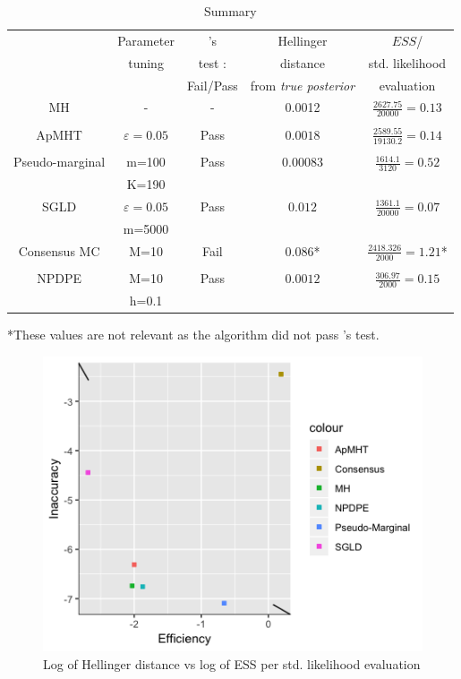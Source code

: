 \documentclass[11pt,a4paper]{report}\usepackage[]{graphicx}\usepackage[]{color}
\begin{document}
\begin{table}[H]
    \centering
    \caption{Summary}
    \label{tab1}
    \begin{tabular}{ccccc}
\hline
&Parameter &\cite{geweke2004getting}'s & Hellinger & $ESS$/\\
&tuning&test :&distance&std. likelihood\\
&&  Fail/Pass &  from \textit{true posterior} &    evaluation\\

\hline
MH &-& - & 0.0012 & $\frac{2627.75}{20000}=0.13$ \\
&&&&\\
\hline
ApMHT &$\varepsilon=0.05$& Pass & $0.0018$ & $\frac{2589.55}{19130.2}=0.14$ \\
&&&&\\
\hline
Pseudo-marginal &m=100& Pass & $0.00083$ &$\frac{1614.1}{3120}=0.52$\\
&K=190&&&\\
\hline
SGLD &$\varepsilon=0.05$& Pass & $0.012$ & $\frac{1361.1}{20000}=0.07$\\
&m=5000&&&\\
\hline
Consensus MC &M=10& Fail & $0.086$* & $\frac{2418.326}{2000}=1.21$*\\
&&&&\\
\hline
NPDPE &M=10& Pass & $0.0012$&$\frac{306.97}{2000}=0.15$\\
&h=0.1&&&\\
\hline
\end{tabular}
\small{*These values are not relevant as the algorithm did not pass \cite{geweke2004getting}'s test.}
\end{table}

\begin{figure}[H]
\caption{Log of Hellinger distance vs log of ESS per std. likelihood evaluation}
\centering

  \includegraphics[resolution=110]{DGP2_plots/DGP2_HD_ESS.png}

\end{figure}
\end{document}

